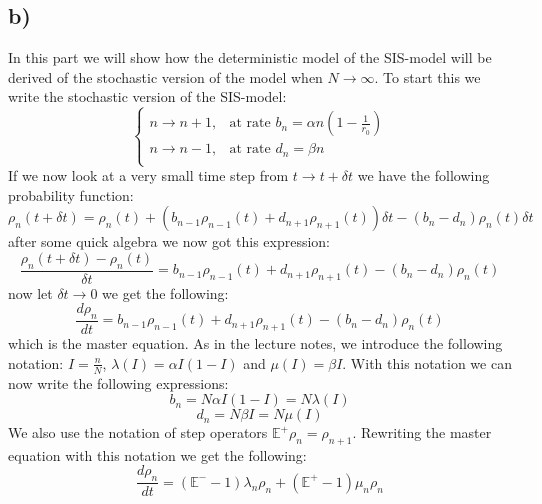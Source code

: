 \documentclass[15pt]{article}
\begin{document}
\subsection{b)}
In this part we will show how the deterministic model of the SIS-model will be derived of the stochastic version of the model when $N \rightarrow \infty$. To start this we write the stochastic version of the SIS-model:
\begin{equation}
	\begin{cases}
		n \rightarrow n+1, & \text{at rate }b_n = \alpha n (1- \frac{1}{r_0}) \\
		n \rightarrow n-1, & \text{at rate }d_n = \beta n                     \\
	\end{cases}
	\label{eq:stochastic equations}
\end{equation}
If we now look at a very small time step from $t \rightarrow t + \delta t$ we have the following probability function:
\begin{equation}
	\rho_n(t+ \delta t) = \rho_n(t) + \left(b_{n-1}\rho_{n-1}(t) + d_{n+1}\rho_{n+1}(t)\right)\delta t - (b_n - d_n)\rho_n(t)\delta t
\end{equation}
after some quick algebra we now got this expression:
\begin{equation}
	\frac{\rho_n(t+ \delta t) - \rho_n(t)}{\delta t}  = b_{n-1}\rho_{n-1}(t) + d_{n+1}\rho_{n+1}(t) - (b_n - d_n)\rho_n(t)
	\label{eq:}
\end{equation}
now let $\delta t \rightarrow 0$ we get the following:
\begin{equation}
	\frac{d\rho_n}{dt}= b_{n-1}\rho_{n-1}(t) + d_{n+1}\rho_{n+1}(t) - (b_n - d_n)\rho_n(t)
\end{equation}
which is the master equation. As in the lecture notes, we introduce the following notation: $ I = \frac{n}{N}$, $\lambda (I) = \alpha I (1-I)$ and $\mu (I)= \beta I$. With this notation we can now write the following expressions:
\begin{equation}
	b_n = N \alpha I(1-I) = N \lambda(I)
\end{equation}
\begin{equation}
	d_n = N \beta I = N\mu(I)
\end{equation}
We also use the notation of step operators $\mathbb{E^+}\rho_n= \rho_{n+1}$.
Rewriting the master equation with this notation we get the following:
\begin{equation}
	\frac{d\rho_n}{dt} = (\mathbb{E^-} -1) \lambda_n \rho_n + (\mathbb{E^+}- 1)\mu_n \rho_n
\end{equation}
\end{document}

